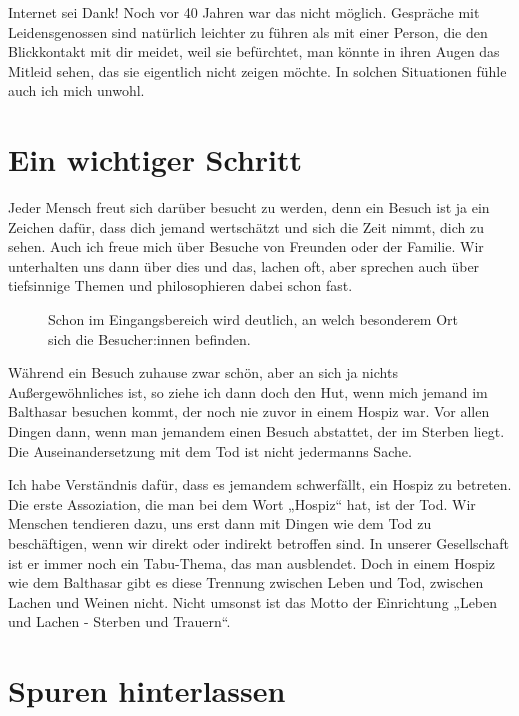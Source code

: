 \documentclass[fontsize=14pt,a4paper,headinclude,DIV=calc,automark]{scrbook}
\begin{document}
Internet sei Dank! Noch vor 40 Jahren war das nicht möglich. Gespräche mit Leidensgenossen sind natürlich leichter zu führen als mit einer Person, die den Blickkontakt mit dir meidet, weil sie befürchtet, man könnte in ihren Augen das Mitleid sehen, das sie eigentlich nicht zeigen möchte. In solchen Situationen fühle auch ich mich unwohl.

\section{Ein wichtiger Schritt}

Jeder Mensch freut sich darüber besucht zu werden, denn ein Besuch ist ja ein Zeichen dafür, dass dich jemand wertschätzt und sich die Zeit nimmt, dich zu sehen. Auch ich freue mich über Besuche von Freunden oder der Familie. Wir unterhalten uns dann über dies und das, lachen oft, aber sprechen auch über tiefsinnige Themen und philosophieren dabei schon fast.

\setlength{\fboxsep}{0pt}    %
\setlength{\fboxrule}{0.2pt} %
\begin{figure}[ht]
    \raggedright
    \caption{Schon im Eingangsbereich wird deutlich, an welch besonderem Ort sich die Besucher:innen befinden.}
    \label{fig:motto}
\end{figure}

Während ein Besuch zuhause zwar schön, aber an sich ja nichts Außergewöhnliches ist, so ziehe ich dann doch den Hut, wenn mich jemand im Balthasar besuchen kommt, der noch nie zuvor in einem Hospiz war. Vor allen Dingen dann, wenn man jemandem einen Besuch abstattet, der im Sterben liegt. Die Auseinandersetzung mit dem Tod ist nicht jedermanns Sache.

Ich habe Verständnis dafür, dass es jemandem schwerfällt, ein Hospiz zu betreten. Die erste Assoziation, die man bei dem Wort „Hospiz“ hat, ist der Tod. Wir Menschen tendieren dazu, uns erst dann mit Dingen wie dem Tod zu beschäftigen, wenn wir direkt oder indirekt betroffen sind. In unserer Gesellschaft ist er immer noch ein Tabu-Thema, das man ausblendet. Doch in einem Hospiz wie dem Balthasar gibt es diese Trennung zwischen Leben und Tod, zwischen Lachen und Weinen nicht. Nicht umsonst ist das Motto der Einrichtung „Leben und Lachen - Sterben und Trauern“.

\section{Spuren hinterlassen}
\end{document}
